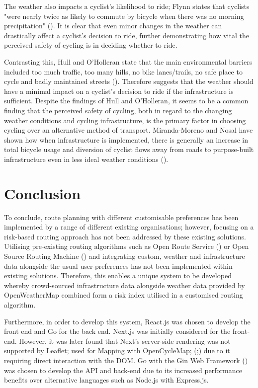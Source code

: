 The weather also impacts a cyclist's likelihood to ride; Flynn states that cyclists "were nearly twice as likely to commute by bicycle when there was no morning precipitation" (\cite{flynn_weather_2012}). It is clear that even minor changes in the weather can drastically affect a cyclist's decision to ride, further demonstrating how vital the perceived safety of cycling is in deciding whether to ride. 

Contrasting this, Hull and O'Holleran state that the main environmental barriers included too much traffic, too many hills, no bike lanes/trails, no safe place to cycle and badly maintained streets (\cite{hull_bicycle_2014}). Therefore suggests that the weather should have a minimal impact on a cyclist's decision to ride if the infrastructure is sufficient. Despite the findings of Hull and O'Holleran, it seems to be a common finding that the perceived safety of cycling, both in regard to the changing weather conditions and cycling infrastructure, is the primary factor in choosing cycling over an alternative method of transport. Miranda-Moreno and Nosal have shown how when infrastructure is implemented, there is generally an increase in total bicycle usage and diversion of cyclist flows away from roads to purpose-built infrastructure even in less ideal weather conditions (\cite{miranda-moreno_weather_2011}).

\section{Conclusion}
\label{litrev:conclusion}

To conclude, route planning with different customisable preferences has been implemented by a range of different existing organisations; however, focusing on a risk-based routing approach has not been addressed by these existing solutions. Utilising pre-existing routing algorithms such as Open Route Service (\cite{noauthor_openrouteservice_nodate}) or Open Source Routing Machine (\cite{noauthor_project_nodate}) and integrating custom, weather and infrastructure data alongside the usual user-preferences has not been implemented within existing solutions. Therefore, this enables a unique system to be developed whereby crowd-sourced infrastructure data alongside weather data provided by OpenWeatherMap combined form a risk index utilised in a customised routing algorithm. %

Furthermore, in order to develop this system, React.js was chosen to develop the front end and Go for the back end. Next.js was initially considered for the front-end. However, it was later found that Next's server-side rendering was not supported by Leaflet; used for Mapping with OpenCycleMap; (\cite{noauthor_leaflet_nodate};\cite{noauthor_opencyclemaporg_nodate}) due to it requiring direct interaction with the DOM. Go with the Gin Web Framework (\cite{noauthor_gin_nodate}) was chosen to develop the API and back-end due to its increased performance benefits over alternative languages such as Node.js with Express.js.